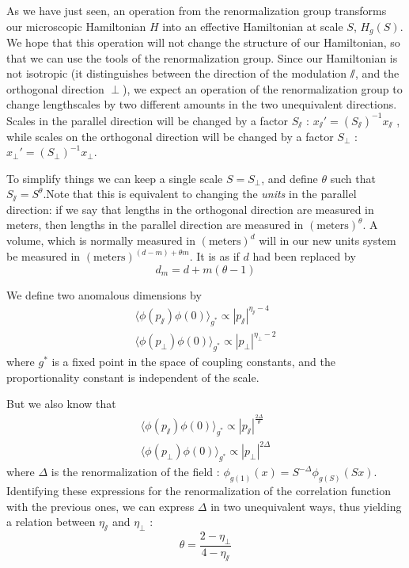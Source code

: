 As we have just seen, an operation from the renormalization group transforms our microscopic Hamiltonian $H$ into an effective Hamiltonian at scale $S$, $H_g(S)$. We hope that this operation will not change the structure of our Hamiltonian, so that we can use the tools of the renormalization group. 
Since our Hamiltonian is not isotropic (it distinguishes between the direction of the modulation $\sslash$, and the orthogonal direction $\perp$), we expect an operation of the renormalization group to change lengthscales by two different amounts in the two unequivalent directions. 
Scales in the parallel direction will be changed by a factor $S_\sslash$
 : $x_\sslash' = (S_\sslash)^{-1} x_\sslash$
, while scales on the orthogonal direction will be changed by a factor $S_\perp$ : $x_\perp' = (S_\perp)^{-1} x_\perp$.

To simplify things we can keep a single scale $S = S_\perp$, and define $\theta$ such that $S_\sslash = S^\theta$.Note that this is equivalent to changing the \textit{units} in the parallel direction: if we say that lengths in the orthogonal direction are measured in meters, then lengths in the parallel direction are measured in $(\text{meters})^\theta$.
A volume, which is normally measured in $(\text{meters})^d$ will in our new units system be measured in $(\text{meters})^{(d-m) + \theta m}$. It is as if $d$ had been replaced by
\begin{equation}
d_m = d+ m(\theta -1)
\end{equation}

We define two anomalous dimensions by
\begin{align}
\langle \phi(p_\sslash) \phi(0) \rangle_{g^*} \propto |p_\sslash|^{\eta_\sslash -4} \\
\langle \phi(p_\perp) \phi(0) \rangle_{g^*} \propto |p_\perp|^{\eta_\perp -2} 
\end{align}
where $g^*$ is a fixed point in the space of coupling constants, and the proportionality constant is independent of the scale.

But we also know that
\begin{align}
\langle \phi(p_\sslash) \phi(0) \rangle_{g^*} \propto |p_\sslash|^{\frac{2 \Delta}{\theta}} \\
\langle \phi(p_\perp) \phi(0) \rangle_{g^*} \propto |p_\perp|^{2\Delta} 
\end{align}
where $\Delta$ is the renormalization of the field : $\phi_{g(1)}(x) = S^{-\Delta} \phi_{g(S)}(Sx)$. 
Identifying these expressions for the renormalization of the correlation function with the previous ones, we can express $\Delta$ in two unequivalent ways, thus yielding a relation between $\eta_\sslash$ and $\eta_\perp$ :
\begin{equation}
\theta = \frac{2- \eta_\perp}{4- \eta_\sslash}
\end{equation}

